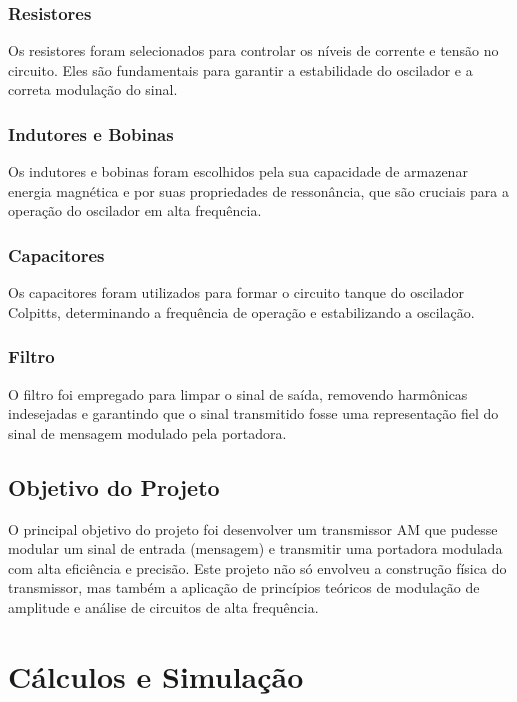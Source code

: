\documentclass[
]{book}
\begin{document}
\subsubsection{Resistores}\label{resistores}

Os resistores foram selecionados para controlar os níveis de corrente e tensão no circuito. Eles são fundamentais para garantir a estabilidade do oscilador e a correta modulação do sinal.

\subsubsection{Indutores e Bobinas}\label{indutores-e-bobinas}

Os indutores e bobinas foram escolhidos pela sua capacidade de armazenar energia magnética e por suas propriedades de ressonância, que são cruciais para a operação do oscilador em alta frequência.

\subsubsection{Capacitores}\label{capacitores}

Os capacitores foram utilizados para formar o circuito tanque do oscilador Colpitts, determinando a frequência de operação e estabilizando a oscilação.

\subsubsection{Filtro}\label{filtro}

O filtro foi empregado para limpar o sinal de saída, removendo harmônicas indesejadas e garantindo que o sinal transmitido fosse uma representação fiel do sinal de mensagem modulado pela portadora.

\subsection{Objetivo do Projeto}\label{objetivo-do-projeto}

O principal objetivo do projeto foi desenvolver um transmissor AM que pudesse modular um sinal de entrada (mensagem) e transmitir uma portadora modulada com alta eficiência e precisão. Este projeto não só envolveu a construção física do transmissor, mas também a aplicação de princípios teóricos de modulação de amplitude e análise de circuitos de alta frequência.

\section{Cálculos e Simulação}\label{cuxe1lculos-e-simulauxe7uxe3o}
\end{document}

